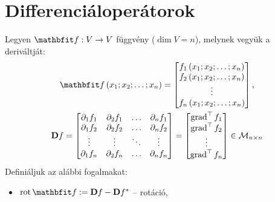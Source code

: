 \clearpage
\section{Differenciáloperátorok}

\begin{blueBox}
  Legyen $\vfunc f: V \rightarrow V$ függvény ($\dim V = n$), melynek vegyük a
  deriváltját:
  \begin{gather*}
    \vfunc f \left( x_1; x_2; \dots ; x_n \right)
    =
    \begin{bmatrix}
      f_1 \left( x_1; x_2; \dots ; x_n \right) \\
      f_2 \left( x_1; x_2; \dots ; x_n \right) \\
      \vdots                                   \\
      f_n \left( x_1; x_2; \dots ; x_n \right) \\
    \end{bmatrix}
    \text,
    \\
    \DD f
    =
    \begin{bmatrix}
      \partial_1 f_1 & \partial_2 f_1 & \dots  & \partial_n f_1 \\
      \partial_1 f_2 & \partial_2 f_2 & \dots  & \partial_n f_2 \\
      \vdots         & \vdots         & \ddots & \vdots         \\
      \partial_1 f_n & \partial_2 f_n & \dots  & \partial_n f_n
    \end{bmatrix}
    =
    \begin{bmatrix}
      \grad^\T f_1 \\
      \grad^\T f_2 \\
      \vdots       \\
      \grad^\T f_n \\
    \end{bmatrix}
    \in
    \mathcal M_{n \times n}
  \end{gather*}
  Definiáljuk az alábbi fogalmakat:
  \begin{itemize}
    \item $\rot \vfunc f := \DD f - \DD f^*$
          -- rotáció,


\end{itemize}
\end{blueBox}

